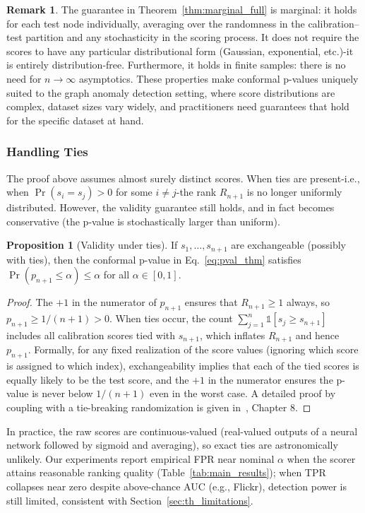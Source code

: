 \documentclass[a4paper]{cas-dc}
\theoremstyle{definition}
\newtheorem{proposition}{Proposition}
\newtheorem{remark}{Remark}
\begin{document}
\begin{remark}
The guarantee in Theorem~\ref{thm:marginal_full} is {marginal}: it holds for each test node individually, averaging over the randomness in the calibration--test partition and any stochasticity in the scoring process.  It does not require the scores to have any particular distributional form (Gaussian, exponential, etc.)-it is entirely {distribution-free}.  Furthermore, it holds in {finite samples}: there is no need for $n \to \infty$ asymptotics.  These properties make conformal p-values uniquely suited to the graph anomaly detection setting, where score distributions are complex, dataset sizes vary widely, and practitioners need guarantees that hold for the specific dataset at hand.
\end{remark}

\subsubsection{Handling Ties}
\label{sec:th_ties}

The proof above assumes almost surely distinct scores.  When ties are present-i.e., when $\Pr(s_i = s_j) > 0$ for some $i \neq j$-the rank $R_{n+1}$ is no longer uniformly distributed.  However, the validity guarantee still holds, and in fact becomes {conservative} (the p-value is stochastically larger than uniform).
\begin{proposition}[Validity under ties]
\label{prop:ties}
If $s_1, \ldots, s_{n+1}$ are exchangeable (possibly with ties), then the conformal p-value in Eq.~\eqref{eq:pval_thm} satisfies $\Pr(p_{n+1} \leq \alpha) \leq \alpha$ for all $\alpha \in [0,1]$.
\end{proposition}
\begin{proof}
The $+1$ in the numerator of $p_{n+1}$ ensures that $R_{n+1} \geq 1$ always, so $p_{n+1} \geq 1/(n+1) > 0$.  When ties occur, the count $\sum_{j=1}^{n}\mathbb{1}[s_j \geq s_{n+1}]$ includes all calibration scores tied with $s_{n+1}$, which {inflates} $R_{n+1}$ and hence $p_{n+1}$.  Formally, for any fixed realization of the score values (ignoring which score is assigned to which index), exchangeability implies that each of the tied scores is equally likely to be the test score, and the $+1$ in the numerator ensures the p-value is never below $1/(n+1)$ even in the worst case.  A detailed proof by coupling with a tie-breaking randomization is given in~\cite{vovk2005algorithmic}, Chapter 8.
\end{proof}
In practice, the raw scores are continuous-valued (real-valued outputs of a neural network followed by sigmoid and averaging), so exact ties are astronomically unlikely.  Our experiments report empirical FPR near nominal $\alpha$ when the scorer attains reasonable ranking quality (Table~\ref{tab:main_results}); when TPR collapses near zero despite above-chance AUC (e.g., Flickr), detection power is still limited, consistent with Section~\ref{sec:th_limitations}.
\end{document}

